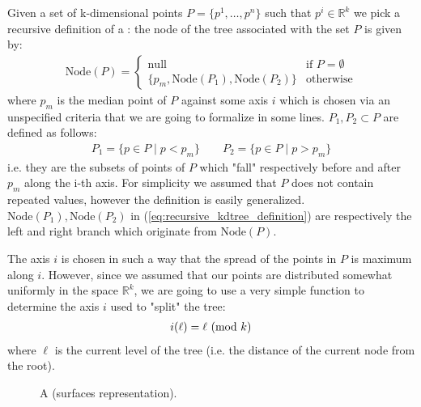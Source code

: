 \documentclass{article}
\begin{document}
\section{\kdtree{}}
Given a set of k-dimensional points $P = \{p^1, \dots, p^n\}$ such that
$p^i \in \mathbb{R}^k$ we pick a recursive definition of a \kdtree{}
\cite{skrodzki2019kd}: the node of the tree associated with the set $P$ is given
by:
\begin{gather} \label{eq:recursive_kdtree_definition}
    \text{Node}(P) = \begin{cases}
        \text{null} &\text{if } P = \emptyset\\
        \{p_m, \text{Node}(P_1), \text{Node}(P_2)\} &\text{otherwise}
    \end{cases}
\end{gather}
where $p_m$ is the median point of $P$ against some axis $i$ which is chosen
via an unspecified criteria that we are going to formalize in some lines.
$P_1, P_2 \subset P$ are defined as follows:
\begin{gather*}
    P_1 = \{p \in P \mid p < p_m\} \qquad P_2 = \{p \in P \mid p > p_m\}
\end{gather*}
i.e. they are the subsets of points of $P$ which "fall" respectively before
and after $p_m$ along the i-th axis. For simplicity we assumed that $P$ does not
contain repeated values, however the definition is easily generalized.
$\text{Node}(P_1), \text{Node}(P_2)$ in (\ref*{eq:recursive_kdtree_definition})
are respectively the left and right branch which originate from
$\text{Node}(P)$.

The axis $i$ is chosen in such a way that the spread of the points in $P$ is
maximum along $i$. However, since we assumed that our points are distributed
somewhat uniformly in the space $\mathbb{R}^k$, we are going to use a very
simple function to determine the axis $i$ used to "split" the tree:
\begin{gather} \label{eq:axis_criteria}
    i(\ell) = \ell \ (\mathrm{mod}\ k)
\end{gather}
where $\ell$ is the current level of the tree (i.e. the distance of the current
node from the root).

\begin{figure}[b!]
    \caption{A \kdtree{} (surfaces representation).}
    \label{fig:kdtree_surfaces_progression}
\end{figure}
\end{document}
